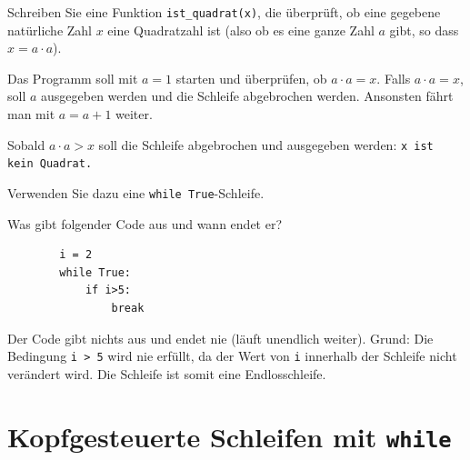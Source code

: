 \begin{myexercise}
	Schreiben Sie eine Funktion \lstinline|ist_quadrat(x)|, die überprüft, ob eine gegebene natürliche Zahl $x$ eine Quadratzahl ist (also ob es eine ganze Zahl $a$ gibt, so dass $x = a \cdot a$).

	Das Programm soll mit $a = 1$ starten und überprüfen, ob $a \cdot a = x$. Falls $a \cdot a = x$, soll $a$ ausgegeben werden und die Schleife abgebrochen werden. Ansonsten fährt man mit $a = a+1$ weiter.

	Sobald $a \cdot a > x$ soll die Schleife abgebrochen und ausgegeben werden: \texttt{x ist kein Quadrat.}

	Verwenden Sie dazu eine \lstinline|while True|-Schleife.

	\begin{myanswer}
		
	\end{myanswer}
\end{myexercise}

\begin{mychallenge}
	Was gibt folgender Code aus und wann endet er?
	\begin{lstlisting}
		i = 2
		while True:
			if i>5:
				break
	\end{lstlisting}

	\begin{myanswer}
		Der Code gibt nichts aus und endet nie (läuft unendlich weiter). Grund: Die Bedingung \lstinline|i > 5| wird nie erfüllt, da der Wert von \lstinline|i| innerhalb der Schleife nicht verändert wird. Die Schleife ist somit eine Endlosschleife.
	\end{myanswer}
\end{mychallenge}

\section{Kopfgesteuerte Schleifen mit \texorpdfstring{\lstinline|while|}{while}}

